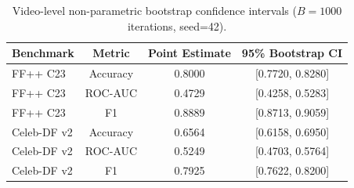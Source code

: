\begin{table}[ht]
\centering\small
\begin{tabular}{lccc}
\toprule
Benchmark & Metric & Point Estimate & 95\% Bootstrap CI \\
\midrule
FF++ C23 & Accuracy & 0.8000 & [0.7720, 0.8280] \\
FF++ C23 & ROC-AUC & 0.4729 & [0.4258, 0.5283] \\
FF++ C23 & F1 & 0.8889 & [0.8713, 0.9059] \\
\midrule
Celeb-DF v2 & Accuracy & 0.6564 & [0.6158, 0.6950] \\
Celeb-DF v2 & ROC-AUC & 0.5249 & [0.4703, 0.5764] \\
Celeb-DF v2 & F1 & 0.7925 & [0.7622, 0.8200] \\
\bottomrule
\end{tabular}
\caption{Video-level non-parametric bootstrap confidence intervals ($B=1000$ iterations, seed=42).}
\label{tab:confidence_intervals}
\end{table}
